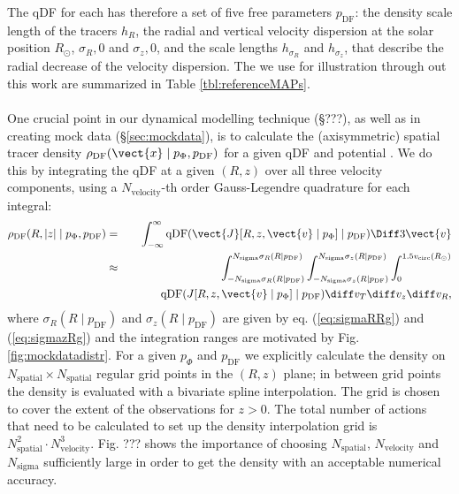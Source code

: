 The qDF for each \MAP has therefore a set of five free parameters $p_\text{DF}$: the density scale length of the tracers $h_R$, the radial and vertical velocity dispersion at the solar position $R_\odot$, $\sigma_R,0$ and $\sigma_z,0$, and the scale lengths $h_{\sigma_R}$ and $h_{\sigma_z}$, that describe the radial decrease of the velocity dispersion. The \MAPs we use for illustration through out this work are summarized in Table \ref{tbl:referenceMAPs}.
\\\\One crucial point in our dynamical modelling technique (\S ???), as well as in creating mock data (\S\ref{sec:mockdata}), is to calculate the (axisymmetric) spatial tracer density $\rho_\text{DF}(\vect{x} \mid p_{\Phi},p_\text{DF})$ for a given qDF and potential . We do this by integrating the qDF at a given $(R,z)$ over all three velocity components, using a $N_\text{velocity}$-th order Gauss-Legendre quadrature for each integral:
\begin{eqnarray}
\rho_\text{DF}(R,|z| \mid p_{\Phi},p_\text{DF}) &=& \int_{-\infty}^{\infty} \text{qDF}(\vect{J}[R,z,\vect{v} \mid p_{\Phi}] \mid p_\text{DF}) \Diff3\vect{v}  \label{eq:tracerdensity_general}\\
&\approx& \int_{-N_\text{sigma} \sigma_R(R \mid p_\text{DF})}^{N_\text{sigma} \sigma_R(R \mid p_\text{DF})} \int_{-N_\text{sigma}\sigma_z(R \mid p_\text{DF})}^{N_\text{sigma} \sigma_z(R \mid p_\text{DF})} \int_{0}^{1.5 v_\text{circ}(R_\odot)}  \nonumber\\
& & \hspace{1cm} \text{qDF}(J[R,z,\vect{v} \mid p_{\Phi}] \mid p_\text{DF}) \diff v_T \diff v_z \diff v_R, \label{eq:tracerdensity}
\end{eqnarray}
where $\sigma_R(R \mid p_\text{DF})$ and $\sigma_z(R \mid p_\text{DF})$ are given by eq. (\ref{eq:sigmaRRg}) and (\ref{eq:sigmazRg}) and the integration ranges are motivated by Fig. \ref{fig:mockdatadistr}. For a given $p_\Phi$ and $p_\text{DF}$ we explicitly calculate the density on $N_\text{spatial} \times N_\text{spatial}$ regular grid points in the $(R,z)$ plane; in between grid points the density is evaluated with a bivariate spline interpolation. The grid is chosen to cover the extent of the observations for $z>0$. The total number of actions that need to be calculated to set up the density interpolation grid is $N_\text{spatial}^2 \cdot N_\text{velocity}^3$. Fig. ??? shows the importance of choosing $N_\text{spatial}$, $N_\text{velocity}$ and $N_\text{sigma}$ sufficiently large in order to get the density with an acceptable numerical accuracy. 

